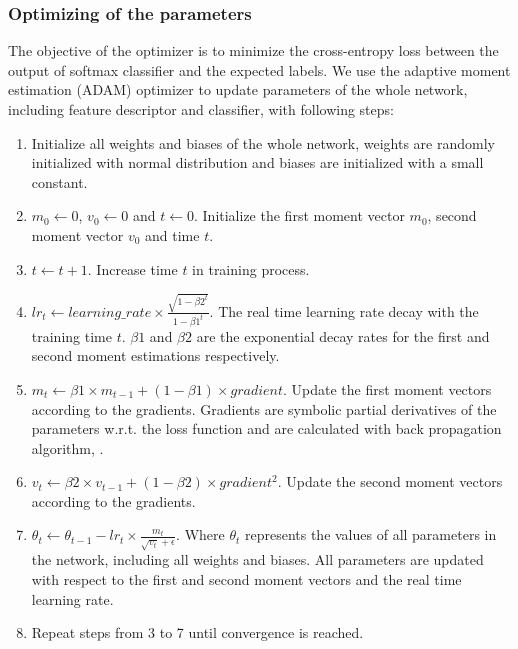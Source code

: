 \subsubsection*{Optimizing of the parameters}
\label{optimizer}
The objective of the optimizer is to minimize the cross-entropy loss between the output of softmax classifier and the expected labels. We use the adaptive moment estimation (ADAM) \cite{adam} optimizer to update parameters of the whole network, including feature descriptor and classifier, with following steps: 
\begin{enumerate}
	\item Initialize all weights and biases of the whole network, weights are randomly initialized with normal distribution and biases are initialized with a small constant.
	
	\item \(m_0 \leftarrow 0\), \(v_0 \leftarrow 0\) and \(t \leftarrow 0\). Initialize the first moment vector \(m_0\), second moment vector \(v_0\) and time \(t\).
	
	\item \(t \leftarrow t + 1 \). Increase time \(t\) in training process.
	\item \(lr_t \leftarrow learning\_rate \times \frac{\sqrt{1 - \beta2^t}}{1 - \beta1^t}\). The real time learning rate decay with the training time \(t\). \(\beta1\) and \(\beta2\) are the exponential decay rates for the first and second moment estimations respectively.
	
	\item \(m_t \leftarrow \beta1 \times m_{t-1} + (1-\beta1) \times gradient \). Update the first moment vectors according to the gradients. Gradients are symbolic partial derivatives of the parameters w.r.t. the loss function and are calculated with back propagation algorithm, \cite{bpa}. 
	
	\item \(v_t \leftarrow \beta2 \times v_{t-1} + (1-\beta2) \times gradient^2 \). Update the second moment vectors according to the gradients.
	
	\item \(\theta_t \leftarrow \theta_{t-1} - lr_t \times \frac{m_t}{\sqrt{v_t} + \epsilon}\). Where \(\theta_t\) represents the values of all parameters in the network, including all weights and biases. All parameters are updated with respect to the first and second moment vectors and the real time learning rate.
	 
	\item Repeat steps from 3 to 7 until convergence is reached.  
\end{enumerate}

